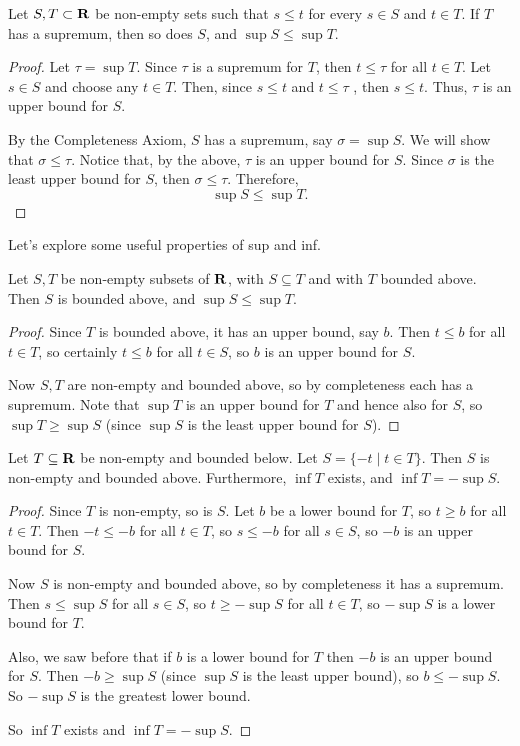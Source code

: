 

\begin{theorem}
Let $S, T \subset \mathbf R$ be non-empty sets such that $s \le t$ for every $s \in S$ and $t \in T$. If $T$ has a supremum, then so does $S$, and $\sup S \le \sup T$.
\end{theorem}

\begin{proof}
Let $\tau = \sup T$. Since $\tau$ is a supremum for $T$, then $t \le \tau$ for all $t \in T$. Let $s \in S$ and choose any $t \in T$. Then, since $s \le t$ and $t \le \tau$ , then $s \le t$. Thus, $\tau$ is an upper bound for $S$. 

By the Completeness Axiom, $S$ has a supremum, say $\sigma = \sup S$. We will show that $\sigma \le \tau$. Notice that, by the above, $\tau$ is an upper bound for $S$. Since $\sigma$ is the least upper bound for $S$, then $\sigma \le \tau$. Therefore,
\[\sup S \le \sup T.\]
\end{proof}

Let's explore some useful properties of sup and inf.

\begin{proposition}
Let $S, T$ be non-empty subsets of $\mathbf R$, with $S \subseteq T$ and with $T$ bounded above. Then $S$ is bounded above, and $\sup S \le \sup T$.
\end{proposition}
\begin{proof}
Since $T$ is bounded above, it has an upper bound, say $b$. Then $t \le b$ for all $t \in T$, so certainly $t \le b$ for all $t \in S$, so $b$ is an upper bound for $S$.

Now $S, T$ are non-empty and bounded above, so by completeness each has a supremum. Note that $\sup T$ is an upper bound for $T$ and hence also for $S$, so $\sup T \ge \sup S$ (since $\sup S$ is the least upper bound for $S$).
\end{proof}

\begin{proposition}
Let $T \subseteq \mathbf R$ be non-empty and bounded below. Let $S = \{-t \mid t \in T\}$. Then $S$ is non-empty and bounded above. Furthermore, $\inf T$ exists, and $\inf T = -\sup S$.
\end{proposition}
\begin{proof}
Since $T$ is non-empty, so is $S$. Let $b$ be a lower bound for $T$, so $t \ge b$ for all $t \in T$. Then $-t \le -b$ for all $t \in T$, so $s \le -b$ for all $s \in S$, so $-b$ is an upper
bound for $S$.

Now $S$ is non-empty and bounded above, so by completeness it has a
supremum. Then $s \le \sup S$ for all $s \in S$, so $t \ge -\sup S$ for all $t \in T$, so $-\sup S$ is a lower bound for $T$.

Also, we saw before that if $b$ is a lower bound for $T$ then $-b$ is an upper bound for $S$. Then $-b \ge \sup S$ (since $\sup S$ is the least upper bound), so $b \le -\sup S$. So $-\sup S$ is the greatest lower bound.

So $\inf T$ exists and $\inf T = -\sup S$.
\end{proof}

